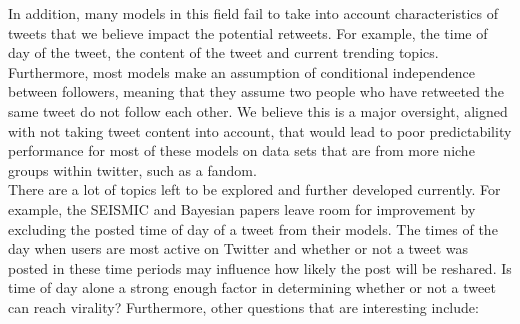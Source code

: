 \documentclass[twoside,twocolumn]{article}
\begin{document}
 In addition, many models in this field fail to take into account characteristics of tweets that we believe impact the potential retweets. For example, the time of day of the tweet, the content of the tweet and current trending topics. Furthermore, most models make an assumption of conditional independence between followers, meaning that they assume two people who have retweeted the same tweet do not follow each other. We believe this is a major oversight, aligned with not taking tweet content into account, that would lead to poor predictability performance for most of these models on data sets that are from more niche groups within twitter, such as a fandom.\\
 
There are a lot of topics left to be explored and further developed currently. For example, the SEISMIC and Bayesian papers leave room for improvement by excluding the posted time of day of a tweet from their models. The times of the day when users are most active on Twitter and whether or not a tweet was posted in these time periods may influence how likely the post will be reshared. Is time of day alone a strong enough factor in determining whether or not a tweet can reach virality? Furthermore, other questions that are interesting include: 
 
\end{document}
